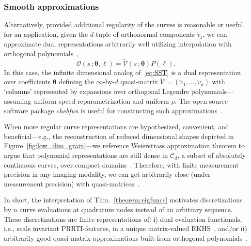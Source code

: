 \documentclass[pdflatex,iicol]{sn-jnl}%
\theoremstyle{thmstyleone}%
\theoremstyle{thmstyletwo}%
\theoremstyle{thmstylethree}%
\begin{document}
\subsubsection{Smooth approximations}
Alternatively, provided additional regularity of the curves is reasonable or useful for an application, given the $d$-tuple of orthonormal components $\widetilde{v}_j$, we can approximate dual representations arbitrarily well utilizing interpolation with orthogonal polynomials~\cite{trefethen2010householder,townsend2015continuous, trefethen2019approximation},
\begin{equation} \label{eq:cont_SST}
    \mathcal{O}(s\,;\boldsymbol{\theta},\boldsymbol{\ell}) = \widetilde{\mathcal{V}}(s \,; \boldsymbol{\theta})P(\boldsymbol{\ell}).
\end{equation}
In this case, the infinite dimensional analog of~\eqref{eq:SST} is a dual representation over coefficients $\boldsymbol{\theta}$ defining the $\infty$-by-$d$ quasi-matrix $\widetilde{\mathcal{V}} = (\widetilde{v}_1,\dots,\widetilde{v}_d)$ with `columns' represented by expansions over orthogonal Legendre polynomials---assuming uniform speed reparametrization and uniform $\rho$. The open source software package \textit{chebfun} is useful for constructing such approximations~\cite{Driscoll2014}.

When more regular curve representations are hypothesized, convenient, and beneficial---e.g., the reconstruction of reduced dimensional shapes depicted in Figure~\ref{fig:low_dim_grain}---we reference Weierstrass approximation theorem to argue that polynomial representations are still dense in $\mathcal{C}_d$, a subset of absolutely continuous curves, over compact domains~\cite{trefethen2019approximation}. Therefore, with finite measurement precision in any imaging modality, we can get arbitrarily close (under measurement precision) with quasi-matrices~\cite{grey2023separable, trefethen2010householder, townsend2015continuous}.

In short, the interpretation of Thm.~\ref{theorem:eigfuncs} motivates discretizations by $n$ curve evaluations at quadrature nodes instead of an arbitrary sequence. These discretizations are finite representations of: i) dual evaluation functionals, i.e., scale invariant PRRTI-features, in a unique matrix-valued RKHS~\cite{micheli2013matrix}, and/or ii) arbitrarily good quasi-matrix approximations built from orthogonal polynomials~\cite{trefethen2010householder,townsend2015continuous}.

\end{document}
